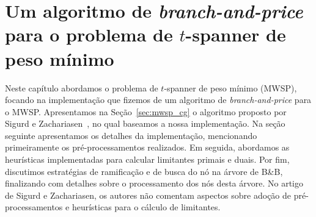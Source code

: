 
\chapter{Um algoritmo de \emph{branch-and-price} para o
  problema de  $t$-spanner de peso mínimo}
\label{cap:mwsp_cg}

\SetInd{0.5em}{0.6em}

Neste capítulo abordamos o problema de $t$-spanner de peso mínimo
(MWSP), focando na implementação que fizemos de um algoritmo de
\emph{branch-and-price} para o MWSP.
Apresentamos na Seção~\ref{sec:mwsp_cg} o
algoritmo proposto por Sigurd e Zachariasen~\cite{SigurdZ2004}, no
qual baseamos a nossa implementação. Na seção seguinte apresentamos os
detalhes da implementação, mencionando primeiramente os
pré-processamentos realizados. Em seguida, abordamos as heurísticas
implementadas para calcular limitantes primais e duais.
Por fim, discutimos estratégias de ramificação e de busca do nó na
árvore de B\&B, finalizando com detalhes sobre o processamento dos nós
desta árvore. No artigo de Sigurd e Zachariasen, os autores não comentam 
 aspectos sobre adoção de pré-processamentos e heurísticas para o cálculo de
  limitantes.



